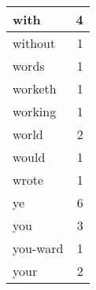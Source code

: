 \begin{center}
\begin{longtable}{l|r}
with & 4\\ \hline 
without & 1\\ \hline 
words & 1\\ \hline 
worketh & 1\\ \hline 
working & 1\\ \hline 
world & 2\\ \hline 
would & 1\\ \hline 
wrote & 1\\ \hline 
ye & 6\\ \hline 
you & 3\\ \hline 
you-ward & 1\\ \hline 
your & 2\\ \hline 
\end{longtable}  
\end{center}  


  
\normalsize  

  
  

